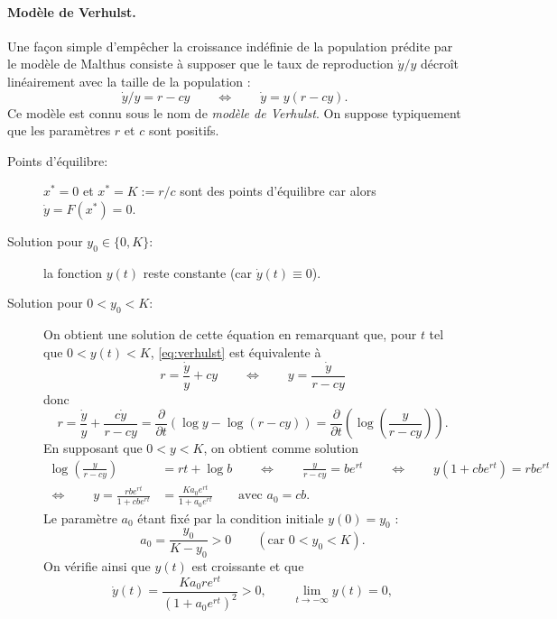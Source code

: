 \paragraph*{Modèle de Verhulst.}
Une façon simple d'empêcher la croissance indéfinie de la population prédite par le modèle de Malthus consiste à supposer que le taux de reproduction $\dot y / y$ décroît linéairement avec la taille de la population : 
\begin{equation} \label{eq:verhulst}
\dot y / y = r - cy
\qquad \Leftrightarrow \qquad
\dot y = y(r - cy).
\end{equation}
Ce modèle est connu sous le nom de {\em modèle de Verhulst}. On suppose typiquement que les paramètres $r$ et $c$ sont positifs.
\begin{description}
  \item[Points d'équilibre:] $x^* = 0$ et $x^* = K := r/c$ sont des points d'équilibre car alors $\dot y = F(x^*) = 0$.
  \item[Solution pour $y_0 \in \{0, K\}$:] la fonction $y(t)$ reste constante (car $\dot y(t) \equiv 0$).
  \item[Solution pour $0 < y_0 < K$:]
  On obtient une solution de cette équation en remarquant que, pour $t$ tel que $0 < y(t) < K$, \eqref{eq:verhulst} est équivalente à 
  $$
  r = \frac{\dot y}y + cy \qquad \Leftrightarrow \qquad y = \frac{\dot y}{r - cy}
  $$
  donc
  \begin{equation} \label{eq:verhulstSolution}
  r 
  = \frac{\dot y}{y} + \frac{c \dot y}{r - cy}
  = \frac{\partial}{\partial t} \left(\log y - \log (r - cy) \right)
  = \frac{\partial}{\partial t} \left(\log \left(\frac{y}{r - cy}\right)\right).
  \end{equation}
  En supposant que $0 < y < K$, on obtient comme solution 
  \begin{align*}
    \log \left(\frac{y}{r - cy}\right) & = rt + \log b
    \qquad \Leftrightarrow \qquad 
    \frac{y}{r - cy} = b e^{rt}
    \qquad \Leftrightarrow \qquad
    y(1 + c b e^{rt}) = r b e^{rt} \\
    \Leftrightarrow \qquad 
    y = \frac{rb e^{rt}}{1 + cb e^{rt}} & = \frac{K a_0 e^{rt}}{1 + a_0 e^{rt}}
    \qquad \text{avec } a_0 = cb.
  \end{align*}
  Le paramètre $a_0$ étant fixé par la condition initiale $y(0) = y_0$ : 
  $$
  a_0 = \frac{y_0}{K-y_0} > 0 \qquad (\text{car } 0  < y_0 < K).
  $$
  On vérifie ainsi que $y(t)$ est croissante et que 
  $$
  \dot y(t) = \frac{Ka_0 r e^{rt}}{(1 + a_0 e^{rt})^2} > 0, 
  \qquad 
  \lim_{t \rightarrow -\infty} y(t) = 0, 
$$
\end{description}
